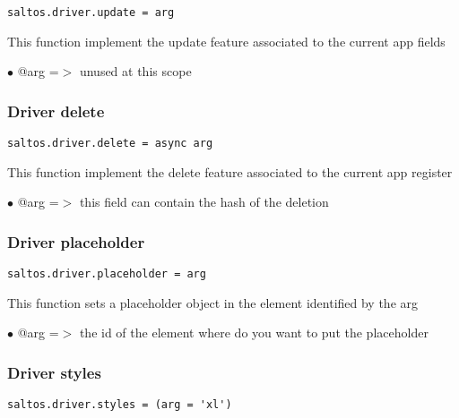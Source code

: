 \documentclass[a4paper]{article}
\begin{document}
\begin{lstlisting}
saltos.driver.update = arg
\end{lstlisting}

This function implement the update feature associated to the current app fields

\begin{compactitem}
\item[\color{myblue}$\bullet$] @arg =$>$ unused at this scope
\end{compactitem}

\hypertarget{toc734}{}
\subsubsection{Driver delete}

\begin{lstlisting}
saltos.driver.delete = async arg
\end{lstlisting}

This function implement the delete feature associated to the current app register

\begin{compactitem}
\item[\color{myblue}$\bullet$] @arg =$>$ this field can contain the hash of the deletion
\end{compactitem}

\hypertarget{toc735}{}
\subsubsection{Driver placeholder}

\begin{lstlisting}
saltos.driver.placeholder = arg
\end{lstlisting}

This function sets a placeholder object in the element identified by the arg

\begin{compactitem}
\item[\color{myblue}$\bullet$] @arg =$>$ the id of the element where do you want to put the placeholder
\end{compactitem}

\hypertarget{toc736}{}
\subsubsection{Driver styles}

\begin{lstlisting}
saltos.driver.styles = (arg = 'xl')
\end{lstlisting}
\end{document}
